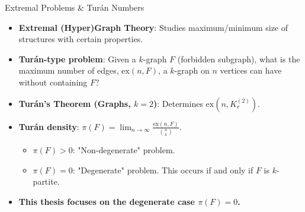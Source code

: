 \documentclass{beamer}
\newcommand{\ex}[2]{\ensuremath{\text{ex} \left( #1, #2 \right)}}
\newcommand{\completesuperindex}[2]{\ensuremath{K^{(#1)}_{#2}}} %
\begin{document}
\begin{frame}{Extremal Problems & Turán Numbers}
  \begin{itemize}
    \item \textbf{Extremal (Hyper)Graph Theory}: Studies maximum/minimum size of structures with certain properties.
    \pause
    \item \textbf{Turán-type problem}: Given a $k$-graph $F$ (forbidden subgraph), what is the maximum number of edges, $\ex{n}{F}$, a $k$-graph on $n$ vertices can have without containing $F$?
    \pause
    \item \textbf{Turán's Theorem (Graphs, $k=2$)}: Determines $\ex{n}{\completesuperindex{2}{r}}$.
    \pause
    \item \textbf{Turán density}: $\pi(F) = \lim_{n \to \infty} \frac{\ex{n}{F}}{\binom{n}{k}}$.
    \begin{itemize}
        \item $\pi(F) > 0$: "Non-degenerate" problem.
        \item $\pi(F) = 0$: "Degenerate" problem. This occurs if and only if $F$ is $k$-partite.
    \end{itemize}
    \pause
    \item \textbf{This thesis focuses on the degenerate case $\pi(F)=0$.}
  \end{itemize}
\end{frame}
\end{document}
